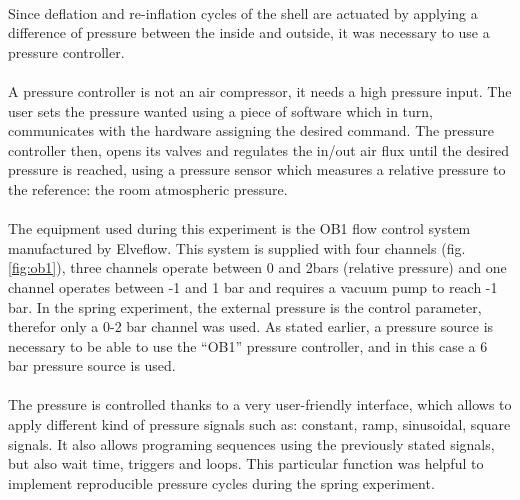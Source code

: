 \paragraph{}
Since deflation and re-inflation cycles of the shell are actuated by applying a difference of pressure between the inside and outside, it was necessary to use a pressure controller.
\paragraph{}
A pressure controller is not an air compressor, it needs a high pressure input. The user sets the pressure wanted using a piece of software which in turn, communicates with the hardware assigning the desired command. The pressure controller then, opens its valves and regulates the in/out air flux until the desired pressure is reached, using a pressure sensor which measures a relative pressure to the reference: the room atmospheric pressure.
\paragraph{}
The equipment used during this experiment is the OB1 flow control system manufactured by Elveflow\textcopyright. This system is supplied with four channels (fig.\ref{fig:ob1}), three channels operate between 0 and 2bars (relative pressure) and one channel operates between -1 and 1 bar and requires a vacuum pump to reach -1 bar.
In the spring experiment, the external pressure is the control parameter, therefor only a 0-2 bar channel was used.
As stated earlier, a pressure source is necessary to be able to use the "`OB1"' pressure controller, and in this case a 6 bar pressure source is used.
\paragraph{}
The pressure is controlled thanks to a very user-friendly interface, which allows to apply different kind of pressure signals such as: constant, ramp, sinusoidal, square signals. It also allows programing sequences using the previously stated signals, but also wait time, triggers and loops. This particular function was helpful to implement reproducible pressure cycles during the spring experiment.
